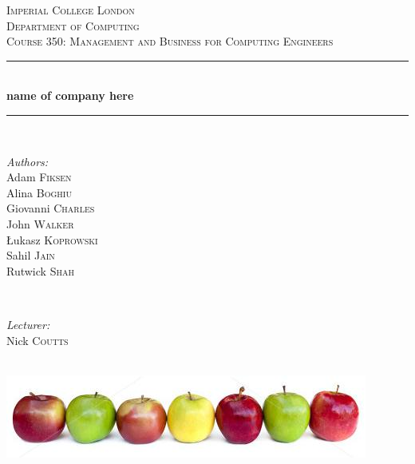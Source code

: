 \documentclass{article}
\begin{document}

\begin{titlepage}
\newcommand{\HRule}{\rule{\linewidth}{0.5mm}}
\center
\textsc{\LARGE Imperial College London}  \\[1.5cm]
\textsc{\Large Department of Computing}  \\[0.5cm]
\textsc{\large Course 350: Management and Business for Computing Engineers} \\[0.5cm]

\HRule \\[0.6cm]
{\huge \bfseries name of company here} \\[0.3cm]
\HRule \\[1.5cm]

\begin{minipage}{0.4\textwidth}

\begin{flushleft} \large \emph{Authors:} \\
Adam  \textsc{Fiksen}\\
Alina  \textsc{Boghiu}\\
Giovanni  \textsc{Charles}\\
John  \textsc{Walker}\\
\L ukasz \textsc{Koprowski}\\
Sahil  \textsc{Jain}\\
Rutwick  \textsc{Shah}\\
\end{flushleft}

\end{minipage}~
\begin{minipage}{0.4\textwidth}

\begin{flushright} \large \emph{Lecturer:} \\
Nick \textsc{Coutts}
\end{flushright}


\end{minipage}\\[4cm]

\includegraphics[width=\textwidth]{apples.jpg}

\end{titlepage}
\end{document}
